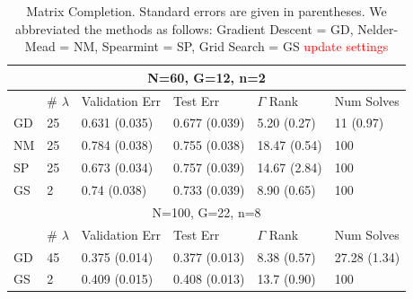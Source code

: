\documentclass[12pt]{article}
\begin{document}
\begin{table}
	\caption{\label{table:matrix_completion} Matrix Completion. Standard errors are given in parentheses. We abbreviated the methods as follows: Gradient Descent = GD, Nelder-Mead = NM, Spearmint = SP, Grid Search = GS \textcolor{red}{update settings}}
	\centering
		\begin{tabular}{| l | l | l | l | l | l |}
		\hline
		\multicolumn{6}{|c|}{N=60, G=12, n=2}\\
		\hline
		& \# $\lambda$ & Validation Err & Test Err& $\Gamma$ Rank & Num Solves\\
		\hline
		GD & 25 & 0.631 (0.035) & 0.677 (0.039) & 5.20 (0.27) & 11 (0.97) \\
		\hline
		NM & 25 & 0.784 (0.038) & 0.755 (0.038) & 18.47 (0.54) & 100 \\
		\hline
		SP & 25 & 0.673 (0.034) & 0.757 (0.039) & 14.67 (2.84) & 100\\
		\hline
		GS & 2 & 0.74 (0.038) & 0.733 (0.039) & 8.90 (0.65) & 100\\
		\hline
		\multicolumn{6}{|c|}{N=100, G=22, n=8}\\
		\hline
		& \# $\lambda$ & Validation Err & Test Err&  $\Gamma$ Rank & Num Solves\\
		\hline
		GD & 45 & 0.375 (0.014) & 0.377 (0.013)&  8.38 (0.57) & 27.28 (1.34) \\
		\hline
		GS & 2 & 0.409 (0.015) & 0.408 (0.013) & 13.7 (0.90) & 100\\
		\hline
	\end{tabular}
\end{table}
\end{document}
